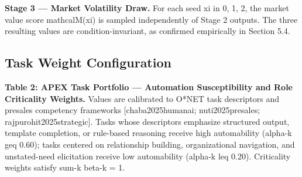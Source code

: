 \documentclass[10pt, conference]{IEEEtran}
\begin{document}
\textbf{Stage 3 --- Market Volatility Draw.} For each seed xi in 0, 1, 2, the market value score mathcalM(xi) is sampled independently of Stage 2 outputs. The three resulting values are condition-invariant, as confirmed empirically in Section 5.4.

\subsection{Task Weight Configuration}

\label{sec:task_weight_configuration}

\textbf{Table 2: APEX Task Portfolio --- Automation Susceptibility and Role Criticality Weights.} Values are calibrated to O*NET task descriptors and presales competency frameworks [chaba2025humanai; nuti2025presales; rajpurohit2025strategic]. Tasks whose descriptors emphasize structured output, template completion, or rule-based reasoning receive high automability (alpha-k geq 0.60); tasks centered on relationship building, organizational navigation, and unstated-need elicitation receive low automability (alpha-k leq 0.20). Criticality weights satisfy sum-k beta-k = 1.

\begin{table}[ht]
\centering
\caption{Comparison of Task across alpha-k (Automability), beta-k (Criticality), Primary Rationale}
\label{tab:1}
\end{table}
\end{document}
